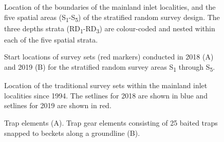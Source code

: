 \documentclass[12pt]{article}\usepackage[]{graphicx}\usepackage[]{color}
\begin{document}
\begin{figure}[htb]

{\centering {} 

}

\caption{Location of the boundaries of the mainland inlet localities, and the five spatial areas (S\textsubscript{1}-S\textsubscript{5}) of the stratified random survey design. The three depths strata (RD\textsubscript{1}-RD\textsubscript{3}) are colour-coded and nested within each of the five spatial strata.}\label{fig:figure1}
\end{figure}
\clearpage


\begin{figure}[htb]

{\centering {} 

}

\caption{Start locations of survey sets (red markers) conducted in 2018 (A) and 2019 (B) for the stratified random survey areas S\textsubscript{1} through S\textsubscript{5}.}\label{fig:figure2}
\end{figure}
\clearpage


\begin{figure}[htb]

{\centering {} 

}

\caption{Location of the traditional survey sets within the mainland inlet localities since 1994. The setlines for 2018 are shown in blue and setlines for 2019 are shown in red.}\label{fig:figure3}
\end{figure}
\clearpage


\begin{figure}[htb]

{\centering {} 

}

\caption{Trap elements (A). Trap gear elements consisting of 25 baited traps snapped to beckets along a groundline (B).}\label{fig:figure4}
\end{figure}
\clearpage
\end{document}
